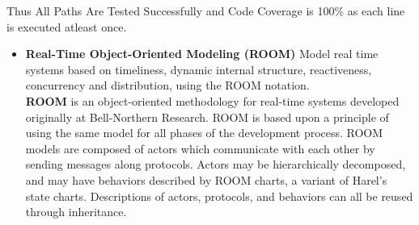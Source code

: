 \documentclass[a4paper,12pt]{article}
\begin{document}
Thus All Paths Are Tested Successfully and Code Coverage is 100\% as each line is executed atleast once.\\\par

\begin{itemize}
\item \textbf{Real-Time Object-Oriented Modeling (ROOM)}
Model real time systems based on timeliness, dynamic internal structure, reactiveness, concurrency and distribution, using the ROOM notation.\\
\textbf{ROOM} is an object-oriented methodology for real-time systems developed originally at Bell-Northern Research. ROOM is based upon a principle of using the same model for all phases of the development process. ROOM models are composed of actors which communicate with each other by sending messages along protocols. Actors may be hierarchically decomposed, and may have behaviors described by ROOM charts, a variant of Harel's state charts. Descriptions of actors, protocols, and behaviors can all be reused through inheritance.
\end{itemize}
\end{document}
